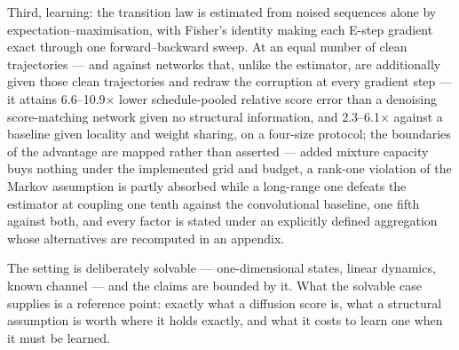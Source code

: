 Third, learning: the transition law is estimated from noised sequences
alone by expectation--maximisation, with Fisher's identity making each
E-step gradient exact through one forward--backward sweep. At an equal
number of clean trajectories --- and against networks that, unlike the
estimator, are additionally given those clean trajectories and redraw the
corruption at every gradient step --- it attains 6.6--10.9$\times$ lower
schedule-pooled relative score error than a denoising score-matching
network given no structural information, and 2.3--6.1$\times$ against a
baseline given locality and weight sharing, on a four-size protocol; the boundaries of the advantage
are mapped rather than asserted --- added mixture capacity buys nothing
under the implemented grid and budget, a rank-one violation of the Markov
assumption is partly absorbed while a long-range one defeats the estimator
at coupling one tenth against the convolutional baseline, one fifth
against both, and every factor is stated under an
explicitly defined aggregation whose alternatives are recomputed in an
appendix.

The setting is deliberately solvable --- one-dimensional states, linear
dynamics, known channel --- and the claims are bounded by it. What the
solvable case supplies is a reference point: exactly what a diffusion score
is, what a structural assumption is worth where it holds exactly, and what
it costs to learn one when it must be learned.
